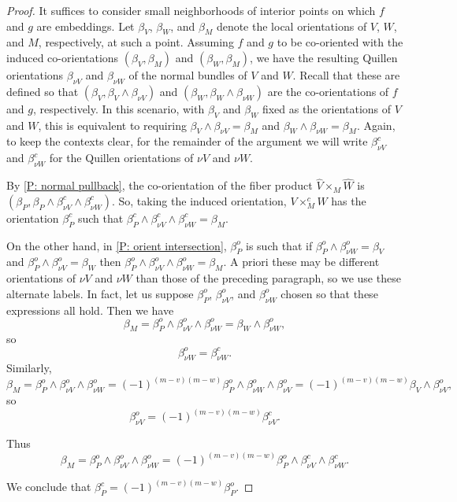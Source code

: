 \begin{proof}
	It suffices to consider small neighborhoods of interior points on which $f$ and $g$ are embeddings.
	Let $\beta_V$, $\beta_W$, and $\beta_M$ denote the local orientations of $V$, $W$, and $M$, respectively, at such a point.
	Assuming $f$ and $g$ to be co-oriented with the induced co-orientations $(\beta_V,\beta_M)$ and $(\beta_W,\beta_M)$, we have the resulting Quillen orientations $\beta_{\nu V}$ and $\beta_{\nu W}$ of the normal bundles of $V$ and $W$.
	Recall that these are defined so that $(\beta_V,\beta_V \wedge \beta_{\nu V})$ and $(\beta_W,\beta_W \wedge \beta_{\nu W})$ are the co-orientations of $f$ and $g$, respectively.
	In this scenario, with $\beta_V$ and $\beta_W$ fixed as the orientations of $V$ and $W$, this is equivalent to requiring $\beta_V \wedge \beta_{\nu V} = \beta_M$ and $\beta_W \wedge \beta_{\nu W} = \beta_M$.
	Again, to keep the contexts clear, for the remainder of the argument we will write $\beta^c_{\nu V}$ and $\beta^c_{\nu W}$ for the Quillen orientations of $\nu V$ and $\nu W$.

	By \cref{P: normal pullback}, the co-orientation of the fiber product $\hat V \times_M \hat W$ is $(\beta_P,\beta_P \wedge \beta^c_{\nu V} \wedge \beta^c_{\nu W})$.
	So, taking the induced orientation, $V\times_M^c W$ has the orientation $\beta_P^c$ such that $\beta_P^c \wedge \beta^c_{\nu V} \wedge \beta^c_{\nu W} = \beta_M$.

	On the other hand, in \cref{P: orient intersection}, $\beta^o_P$ is such that if $\beta^o_P \wedge \beta^o_{\nu W} = \beta_V$ and $\beta^o_P \wedge \beta^o_{\nu V} = \beta_W$ then $\beta^o_P \wedge \beta^o_{\nu V} \wedge \beta^o_{\nu W} = \beta_M.$ A priori these may be different orientations of $\nu V$ and $\nu W$ than those of the preceding paragraph, so we use these alternate labels.
	In fact, let us suppose $\beta^o_P$, $\beta^o_{\nu V}$, and $\beta^o_{\nu W}$ chosen so that these expressions all hold.
	Then we have
	$$\beta_M = \beta^o_P \wedge \beta^o_{\nu V} \wedge \beta^o_{\nu W} = \beta_{W} \wedge \beta^o_{\nu W},$$
	so
	$$\beta_{\nu W}^o = \beta_{\nu W}^c.$$
	Similarly,
	$$\beta_M = \beta^o_P \wedge \beta^o_{\nu V} \wedge \beta^o_{\nu W} = (-1)^{(m-v)(m-w)}\beta^o_P \wedge \beta^o_{\nu W} \wedge \beta^o_{\nu V} = (-1)^{(m-v)(m-w)}\beta_V \wedge \beta^o_{\nu V},$$
	so
	$$\beta^o_{\nu V} = (-1)^{(m-v)(m-w)}\beta^c_{\nu V}.$$

	Thus
	$$\beta_M = \beta^o_P \wedge \beta^o_{\nu V} \wedge \beta^o_{\nu W} = (-1)^{(m-v)(m-w)}\beta^o_P \wedge \beta^c_{\nu V} \wedge \beta^c_{\nu W}.$$

	We conclude that $\beta^c_P = (-1)^{(m-v)(m-w)}\beta^o_P$.
\end{proof}

